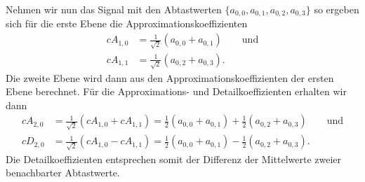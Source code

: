 \begin{refsection}
Nehmen wir nun das Signal mit den Abtastwerten $\{a_{0,0}, a_{0,1}, a_{0,2},
a_{0,3}\}$ so ergeben sich für die erste Ebene die Approximationskoeffizienten
\begin{align}
cA_{1,0}
&=
\frac{1}{\sqrt{2}} (a_{0,0} + a_{0,1})\qquad\text{und}
\nonumber \\
cA_{1,1}
&=
\frac{1}{\sqrt{2}} (a_{0,2} + a_{0,3}).
\end{align}
Die zweite Ebene wird dann aus den Approximationskoeffizienten der ersten Ebene
berechnet. Für die Approximations- und Detailkoeffizienten erhalten wir dann
\begin{align}
cA_{2,0}
&=
\frac{1}{\sqrt{2}} (cA_{1,0} + cA_{1,1})
=
\frac{1}{2} (a_{0,0} + a_{0,1}) + \frac{1}{2} (a_{0,2} + a_{0,3})\qquad \text{und}
\nonumber \\
cD_{2,0}
&=
\frac{1}{\sqrt{2}} (cA_{1,0} - cA_{1,1})
=
\frac{1}{2} (a_{0,0} + a_{0,1}) - \frac{1}{2} (a_{0,2} + a_{0,3}).
\end{align}
Die Detailkoeffizienten entsprechen somit der Differenz der Mittelwerte zweier
benachbarter Abtastwerte.


\end{refsection}
